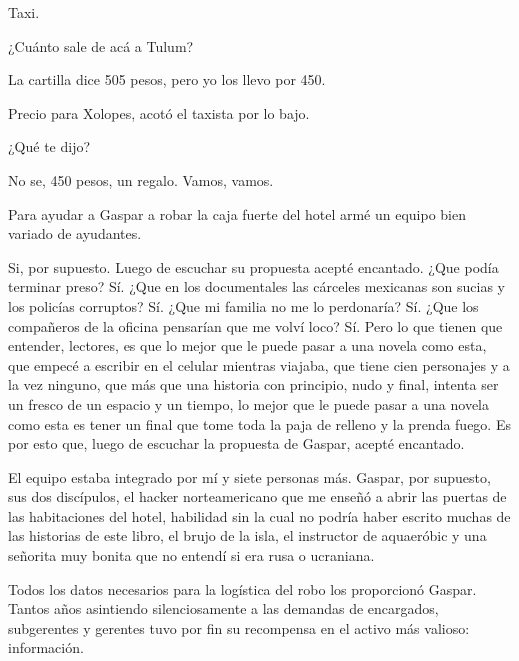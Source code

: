 \documentclass[12pt,twoside,openright,a5paper]{book}
\begin{document}
\vspace{0.5cm}

\hrulefill\hspace{0.2cm} \decofourleft\decofourright \hspace{0.2cm} \hrulefill
\vspace{0.5cm}

Taxi.

¿Cuánto sale de acá a Tulum?

La cartilla dice 505 pesos, pero yo los llevo por 450.

Precio para Xolopes, acotó el taxista por lo bajo.

¿Qué te dijo?

No se, 450 pesos, un regalo. Vamos, vamos.

\vspace{0.5cm}

\hrulefill\hspace{0.2cm} \decofourleft\decofourright \hspace{0.2cm} \hrulefill
\vspace{0.5cm}

Para ayudar a Gaspar a robar la caja fuerte del hotel armé un equipo bien
variado de ayudantes.

Si, por supuesto. Luego de escuchar su propuesta acepté encantado. ¿Que
podía terminar preso? Sí. ¿Que en los documentales las cárceles
mexicanas son sucias y los policías corruptos? Sí. ¿Que mi familia no
me lo perdonaría? Sí. ¿Que los compañeros de la oficina pensarían que
me volví loco? Sí. Pero lo que tienen que entender, lectores, es que lo
mejor que le puede pasar a una novela como esta, que empecé a escribir en el
celular mientras viajaba, que tiene cien personajes y a la vez ninguno, que
más que una historia con principio, nudo y final, intenta ser un fresco de
un espacio y un tiempo, lo mejor que le puede pasar a una novela como esta
es tener un final que tome toda la paja de relleno y la prenda fuego. Es
por esto que, luego de escuchar la propuesta de Gaspar, acepté encantado.

El equipo estaba integrado por mí y siete personas más. Gaspar, por supuesto,
sus dos discípulos, el hacker norteamericano que me enseñó a abrir las
puertas de las habitaciones del hotel, habilidad sin la cual no podría
haber escrito muchas de las historias de este libro, el brujo de la isla,
el instructor de aquaeróbic y una señorita muy bonita que no entendí si
era rusa o ucraniana.

Todos los datos necesarios para la logística del robo los proporcionó
Gaspar. Tantos años asintiendo silenciosamente a las demandas de encargados,
subgerentes y gerentes tuvo por fin su recompensa en el activo más valioso:
información.
\end{document}
